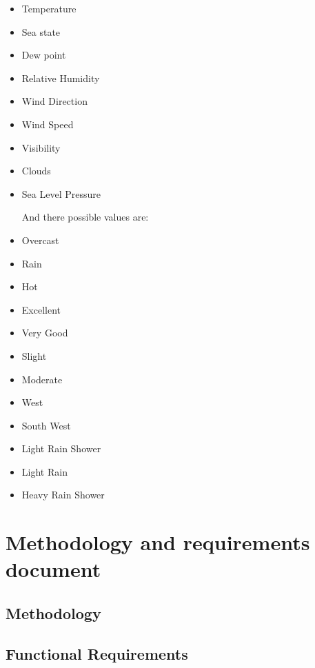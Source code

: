 \documentclass{article}
\begin{document}
\begin{itemize}
\item Temperature 
\item Sea state
\item Dew point
\item Relative Humidity
\item Wind Direction
\item Wind Speed
\item Visibility
\item Clouds 
\item Sea Level Pressure

And there possible values are: 

\item Overcast
\item Rain
\item Hot
\item Excellent
\item Very Good
\item Slight
\item Moderate
\item West
\item South West
\item Light Rain Shower
\item Light Rain
\item Heavy Rain Shower


\end{itemize}
\pagebreak

\section{Methodology and requirements document}
\label{sec:methrecdoc}

\subsection{Methodology}
\label{sec:meth}


\subsection{Functional Requirements}
\end{document}
